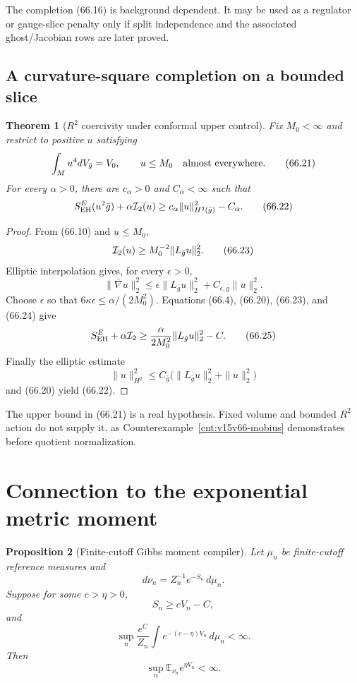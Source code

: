 \documentclass[11pt]{article}
\newtheorem{theorem}{Theorem}[section]
\newtheorem{proposition}[theorem]{Proposition}
\theoremstyle{remark}
\begin{document}
The completion (66.16) is background dependent.  It may be used as
a regulator or gauge-slice penalty only if split independence and
the associated ghost/Jacobian rows are later proved.

\subsection{A curvature-square completion on a bounded slice}

\begin{theorem}[\(R^2\) coercivity under conformal upper control]
\label{thm:v15v66-r2-bounded}
Fix \(M_0<\infty\) and restrict to positive \(u\) satisfying
\[
 \int_Mu^4dV_{\bar g}=V_0,\qquad u\leq M_0
 \quad\hbox{almost everywhere}.                       \tag{66.21}
\]
For every \(\alpha>0\), there are \(c_\alpha>0\) and
\(C_\alpha<\infty\) such that
\[
 S_{\rm EH}^{E}(u^2\bar g)+\alpha{\cal I}_2(u)
 \geq
 c_\alpha\|u\|_{H^2(\bar g)}^2-C_\alpha.              \tag{66.22}
\]
\end{theorem}

\begin{proof}
From (66.10) and \(u\leq M_0\),
\[
 {\cal I}_2(u)
 \geq M_0^{-2}\|L_{\bar g}u\|_2^2.                    \tag{66.23}
\]
Elliptic interpolation gives, for every \(\epsilon>0\),
\[
 \|\bar\nabla u\|_2^2
 \leq
 \epsilon\|L_{\bar g}u\|_2^2+C_{\epsilon,\bar g}\|u\|_2^2.
                                                               \tag{66.24}
\]
Choose \(\epsilon\) so that
\(6\kappa\epsilon\leq\alpha/(2M_0^2)\).
Equations (66.4), (66.20), (66.23), and (66.24) give
\[
 S_{\rm EH}^{E}+\alpha{\cal I}_2
 \geq
 \frac{\alpha}{2M_0^2}\|L_{\bar g}u\|_2^2-C.           \tag{66.25}
\]
Finally the elliptic estimate
\[
 \|u\|_{H^2}^2
 \leq C_{\bar g}\bigl(\|L_{\bar g}u\|_2^2+\|u\|_2^2\bigr)
\]
and (66.20) yield (66.22).
\end{proof}

The upper bound in (66.21) is a real hypothesis.  Fixed volume and
bounded \(R^2\) action do not supply it, as
Counterexample~\ref{cnt:v15v66-mobius} demonstrates before
quotient normalization.

\section{Connection to the exponential metric moment}

\begin{proposition}[Finite-cutoff Gibbs moment compiler]
\label{prop:v15v66-gibbs}
Let \(\mu_n\) be finite-cutoff reference measures and
\[
 d\nu_n=Z_n^{-1}e^{-S_n}\,d\mu_n.
\]
Suppose for some \(c>\eta>0\),
\[
 S_n\geq cV_n-C,                                      \tag{66.26}
\]
and
\[
 \sup_n
 \frac{e^C}{Z_n}
 \int e^{-(c-\eta)V_n}\,d\mu_n<\infty.                \tag{66.27}
\]
Then
\[
 \sup_n\mathbb E_{\nu_n}e^{\eta V_n}<\infty.           \tag{66.28}
\]
\end{proposition}
\end{document}
